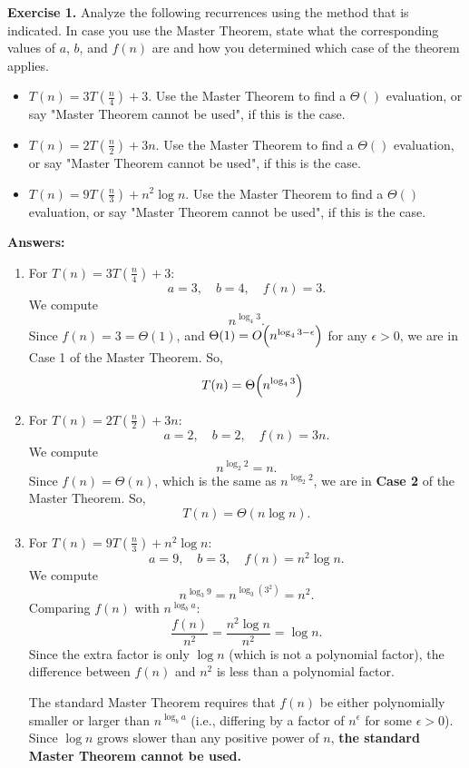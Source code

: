 \documentclass[11pt]{article}
\begin{document}
\textbf{Exercise 1.}  Analyze the following recurrences using the method that is indicated. In case you use the Master Theorem, state what the corresponding values of $a$, $b$, and $f(n)$ are and how
you determined which case of the theorem applies. 

\begin{itemize}
\item  $T(n) = 3 T\left(\frac{n}{4}\right) + 3$. Use the Master Theorem to find a $\Theta()$ evaluation, or say "Master Theorem cannot be used", if this is the case.
\item  $T(n) = 2 T\left(\frac{n}{2}\right) + 3n$. Use the Master Theorem to find a $\Theta()$ evaluation, or say "Master Theorem cannot be used", if this is the case.
\item  $T(n) = 9 T\left(\frac{n}{3}\right) + n^2 \log n $. Use the Master Theorem to find a $\Theta()$ evaluation, or say "Master Theorem cannot be used", if this is the case.
\end{itemize}

\bigskip
\textbf{Answers:}

\begin{enumerate}
\item For $T(n) = 3 T\left(\frac{n}{4}\right) + 3$:
\[
a=3,\quad b=4,\quad f(n)=3.
\]
We compute 
\[
n^{\log_4 3}.
\]
Since $f(n)=3=\Theta(1)$, and $\Theta(1)=O\Bigl(n^{\log_4 3-\epsilon}\Bigr)$ for any $\epsilon>0$, we are in Case 1 of the Master Theorem. So,
{\boldmath\[
\quad T(n)=\Theta\Bigl(n^{\log_4 3}\Bigr)
\]}

\item For $T(n) = 2 T\left(\frac{n}{2}\right) + 3n$:
\[
a=2,\quad b=2,\quad f(n)=3n.
\]
We compute 
\[
n^{\log_2 2}=n.
\]
Since $f(n)=\Theta(n)$, which is the same as $n^{\log_2 2}$, we are in \textbf{Case 2} of the Master Theorem. So,
{\boldmath\[
T(n)=\Theta(n\log n).
\]}

\item For $T(n) = 9 T\left(\frac{n}{3}\right) + n^2 \log n$:
\[
a=9,\quad b=3,\quad f(n)=n^2\log n.
\]
We compute 
\[
n^{\log_3 9}=n^{\log_3 (3^2)}=n^2.
\]
Comparing \( f(n) \) with \( n^{\log_b a} \):
\[
\frac{f(n)}{n^2} = \frac{n^2 \log n}{n^2} = \log n.
\]
Since the extra factor is only \( \log n \) (which is not a polynomial factor), the difference between \( f(n) \) and \( n^2 \) is less than a polynomial factor.

The standard Master Theorem requires that \( f(n) \) be either polynomially smaller or larger than \( n^{\log_b a} \) (i.e., differing by a factor of \( n^\epsilon \) for some \( \epsilon > 0 \)). Since \( \log n \) grows slower than any positive power of \( n \), \textbf{the standard Master Theorem cannot be used.}

\end{enumerate}
\bigskip
\end{document}
